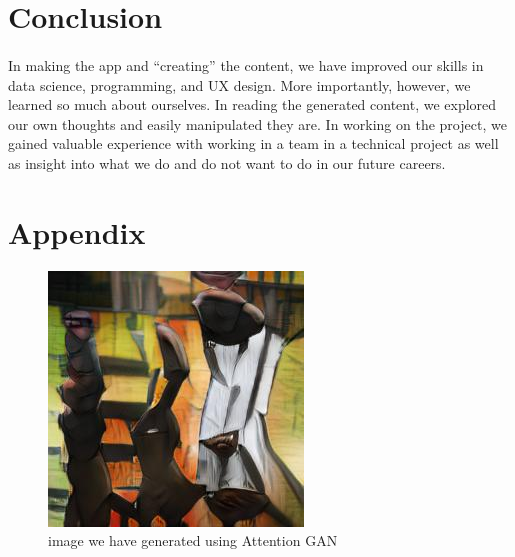 \documentclass[12pt, letterpaper]{article}
\begin{document}
\section{Conclusion}

\paragraph{}In making the app and “creating” the content, we have improved our skills in data science, programming, and UX design. More importantly, however, we learned so much about ourselves. In reading the generated content, we explored our own thoughts and easily manipulated they are. In working on the project, we gained valuable experience with working in a team in a technical project as well as insight into what we do and do not want to do in our future careers.

\section*{Appendix}

\begin{figure}[h]
	\begin{center}
		\includegraphics[width=\linewidth]{imgs/000001075.jpeg}
    		\caption[width=\linewidth]{image we have generated using Attention GAN}
    		\label{AttnGAN}
	\end{center}
\end{figure} 
\end{document}
